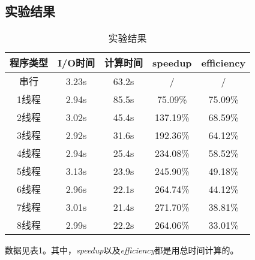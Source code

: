 \documentclass{article}
\begin{document}
	\subsection{实验结果}
	\begin{table}[]
\centering
\caption{实验结果}
\begin{tabular}{ccccc}
\toprule
程序类型 & I/O时间 & 计算时间  & speedup  & efficiency \\ \midrule
串行   & 3.23s & 63.2s & /        & /          \\
1线程  & 2.94s & 85.5s & 75.09\%  & 75.09\%    \\
2线程  & 3.02s & 45.4s & 137.19\% & 68.59\%    \\
3线程  & 2.92s & 31.6s & 192.36\% & 64.12\%    \\
4线程  & 2.94s & 25.4s & 234.08\% & 58.52\%    \\
5线程  & 3.13s & 23.9s & 245.90\% & 49.18\%    \\
6线程  & 2.96s & 22.1s & 264.74\% & 44.12\%    \\
7线程  & 3.01s & 21.4s & 271.70\% & 38.81\%    \\
8线程  & 2.99s & 22.2s & 264.06\% & 33.01\%   \\
\bottomrule
\end{tabular}
\end{table}

数据见表1。其中，\emph{speedup}以及\emph{efficiency}都是用总时间计算的。

	
\end{document}
